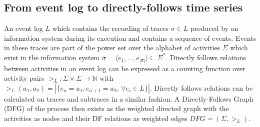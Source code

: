 \subsection{From event log to directly-follows time series}\label{sec:3a:preliminaries}

An event log $L$ which contains the recording of traces $\sigma \in L$ produced by an information system during its execution and contains a sequence of events.
Events in these traces are part of the power set over the alphabet of activities $\Sigma$ which exist in the information system $\sigma=\langle e_1,...,e_{|\sigma|}\rangle \subseteq \Sigma^*$.
Directly follows relations between activities in an event log can be expressed as a counting function over activity pairs $>_L: \Sigma\times\Sigma \to \mathbb{N}$ with $>_L(a_1,a_2) = |\{e_n=a_1,e_{n+1}=a_2, \,\forall e_i\in L\}|$.
Directly follows relations can be calculated on traces and subtraces in a similar fashion.
A Directly-Follows Graph (DFG) of the process then exists as the weighted directed graph with the activities as nodes and their DF relations as weighted edges $DFG=(\Sigma,>_L)$.


